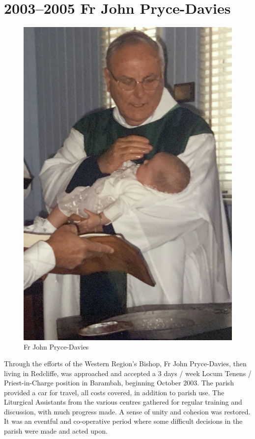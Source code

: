 \section{2003--2005 Fr John Pryce-Davies}









\begin{figure}
\begin{center}
\includegraphics[width=.8\linewidth,center]{../images/JohnPryceDaviesWessling.jpg}
\caption{Fr John Pryce-Davies}
\end{center}
\end{figure}




Through the efforts of the Western Region's Bishop, Fr John Pryce-Davies, then living in Redcliffe, was approached and accepted a 3 days / week Locum Tenens / Priest-in-Charge position in Barambah, beginning October 2003. The parish provided a car for travel, all costs covered, in addition to parish use. The Liturgical Assistants from the various centres gathered for regular training and discussion, with much progress made. A sense of unity and cohesion was restored. It was an eventful and co-operative period where some difficult decisions in the parish were made and acted upon.










